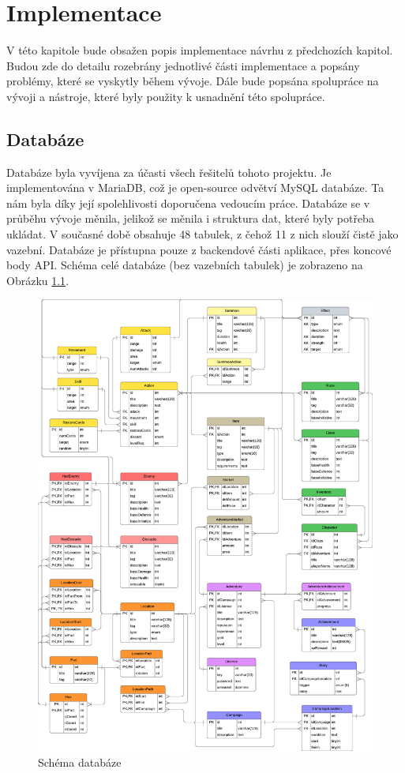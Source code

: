 \chapter{Implementace}
V této kapitole bude obsažen popis implementace návrhu z předchozích kapitol. Budou zde do detailu rozebrány jednotlivé části implementace a popsány problémy, které se vyskytly během vývoje. Dále bude popsána spolupráce na vývoji a nástroje, které byly použity k usnadnění této spolupráce.

\section{Databáze}
Databáze byla vyvíjena za účasti všech řešitelů tohoto projektu. Je implementována v MariaDB, což je open-source odvětví MySQL databáze. Ta nám byla díky její spolehlivosti doporučena vedoucím práce. Databáze se v průběhu vývoje měnila, jelikož se měnila i struktura dat, které byly potřeba ukládat. V současné době obsahuje 48 tabulek, z čehož 11 z nich slouží čistě jako vazební. Databáze je přístupna pouze z backendové části aplikace, přes koncové body API. Schéma celé databáze (bez vazebních tabulek) je zobrazeno na Obrázku \ref{fig:db_schema}.

\begin{figure}[htbp]
  \centering
  \includegraphics[width=.95\textwidth]{../../shared/diagrams/dbScheme.pdf}
  \caption{Schéma databáze}
  \label{fig:db_schema}
\end{figure}

